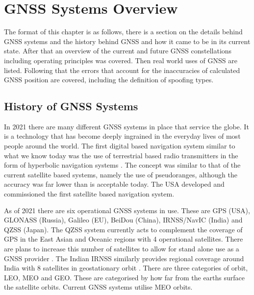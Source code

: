 
\chapter{GNSS Systems Overview} %

\label{Chapter2} %

The format of this chapter is as follows, there is a section on the details behind GNSS systems and the history behind GNSS and how it came to be in its current state. After that
an overview of the current and future GNSS constellations including operating principles was covered. Then real world uses of GNSS are listed. Following that the errors
that account for the inaccuracies of calculated GNSS position are covered, including the definition of spoofing types.


\section{History of GNSS Systems} \label{sec:GNSSHistory}
In 2021 there are many different GNSS systems in place that service the globe. It is a technology that has become deeply ingrained in the everyday lives of most
people around the world. The first digital based navigation system similar to what we know today was the use of terrestrial based radio transmitters in the form of
hyperbolic navigation systems \cite{RN68}. The concept was
similar to that of the current satellite based systems, namely the use of pseudoranges, although the accuracy was far lower than is acceptable today. The USA developed
and commissioned the first satellite based navigation system.

As of 2021 there are six operational GNSS systems in use. These are GPS (USA), GLONASS (Russia), Galileo (EU), BeiDou (China), IRNSS/NavIC (India) and QZSS (Japan). The
QZSS system currently acts to complement the coverage of GPS in the East Asian and Oceanic regions with 4 operational satellites. There are plans to increase this number
of satellites to allow for stand alone use as a GNSS provider \cite{RN47}. The Indian IRNSS similarly provides regional coverage around India with 8 satellites in
geostationary orbit \cite{RN55} . There are three categories of orbit, LEO, MEO and GEO. These are categorised by how far from the earths surface the satellite orbits.
Current GNSS systems utilise MEO orbits.

